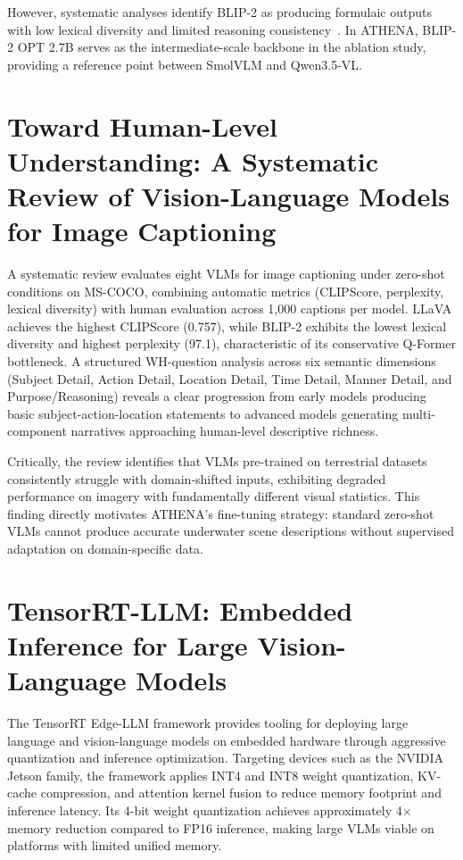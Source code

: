 However, systematic analyses identify BLIP-2 as producing formulaic outputs with low lexical diversity and limited reasoning consistency~\cite{hani2026systematic}. In ATHENA, BLIP-2 OPT 2.7B serves as the intermediate-scale backbone in the ablation study, providing a reference point between SmolVLM and Qwen3.5-VL.

\section[Hani, Tagougui \& Kherallah]{Toward Human-Level Understanding: A Systematic Review of Vision-Language Models for Image Captioning~\cite{hani2026systematic}}
A systematic review evaluates eight VLMs for image captioning under zero-shot conditions on MS-COCO, combining automatic metrics (CLIPScore, perplexity, lexical diversity) with human evaluation across 1,000 captions per model. LLaVA achieves the highest CLIPScore (0.757), while BLIP-2 exhibits the lowest lexical diversity and highest perplexity (97.1), characteristic of its conservative Q-Former bottleneck. A structured WH-question analysis across six semantic dimensions (Subject Detail, Action Detail, Location Detail, Time Detail, Manner Detail, and Purpose/Reasoning) reveals a clear progression from early models producing basic subject-action-location statements to advanced models generating multi-component narratives approaching human-level descriptive richness.

Critically, the review identifies that VLMs pre-trained on terrestrial datasets consistently struggle with domain-shifted inputs, exhibiting degraded performance on imagery with fundamentally different visual statistics. This finding directly motivates ATHENA's fine-tuning strategy: standard zero-shot VLMs cannot produce accurate underwater scene descriptions without supervised adaptation on domain-specific data.

\section[NVIDIA]{TensorRT-LLM: Embedded Inference for Large Vision-Language Models~\cite{tensorrt}}
The TensorRT Edge-LLM framework provides tooling for deploying large language and vision-language models on embedded hardware through aggressive quantization and inference optimization. Targeting devices such as the NVIDIA Jetson family, the framework applies INT4 and INT8 weight quantization, KV-cache compression, and attention kernel fusion to reduce memory footprint and inference latency. Its 4-bit weight quantization achieves approximately 4$\times$ memory reduction compared to FP16 inference, making large VLMs viable on platforms with limited unified memory.

